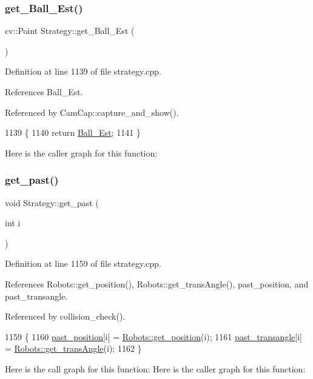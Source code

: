 \subsubsection{\texorpdfstring{get\+\_\+\+Ball\+\_\+\+Est()}{get\_Ball\_Est()}}
{\footnotesize\ttfamily cv\+::\+Point Strategy\+::get\+\_\+\+Ball\+\_\+\+Est (\begin{DoxyParamCaption}{ }\end{DoxyParamCaption})}



Definition at line 1139 of file strategy.\+cpp.



References Ball\+\_\+\+Est.



Referenced by Cam\+Cap\+::capture\+\_\+and\+\_\+show().


\begin{DoxyCode}
1139                                \{
1140     \textcolor{keywordflow}{return} \hyperlink{class_strategy_ae629b11b862d24dba3fb3322659e439e}{Ball\_Est};
1141 \}
\end{DoxyCode}
Here is the caller graph for this function\+:
\mbox{\label{class_strategy_aca1d4847c7663f25e643a5ec3d467da8}} 
\subsubsection{\texorpdfstring{get\+\_\+past()}{get\_past()}}
{\footnotesize\ttfamily void Strategy\+::get\+\_\+past (\begin{DoxyParamCaption}\item[{int}]{i }\end{DoxyParamCaption})}



Definition at line 1159 of file strategy.\+cpp.



References Robots\+::get\+\_\+position(), Robots\+::get\+\_\+trans\+Angle(), past\+\_\+position, and past\+\_\+transangle.



Referenced by collision\+\_\+check().


\begin{DoxyCode}
1159                              \{
1160     \hyperlink{class_strategy_af25c3e91e0deb8592eae48c9bf8d2f18}{past\_position}[i] = \hyperlink{class_robots_a1fca8f2f5070176faa6ba1efa2f1ff14}{Robots::get\_position}(i);
1161     \hyperlink{class_strategy_a8f2c9428adf1de34e420106df1dc2f02}{past\_transangle}[i] = \hyperlink{class_robots_af3cabeacfb88dd920f581939935e76ca}{Robots::get\_transAngle}(i);
1162 \}
\end{DoxyCode}
Here is the call graph for this function\+:
Here is the caller graph for this function\+:
\mbox{\label{class_strategy_ab1c455b23e8b7f3377132a3e243f8f76}} 
